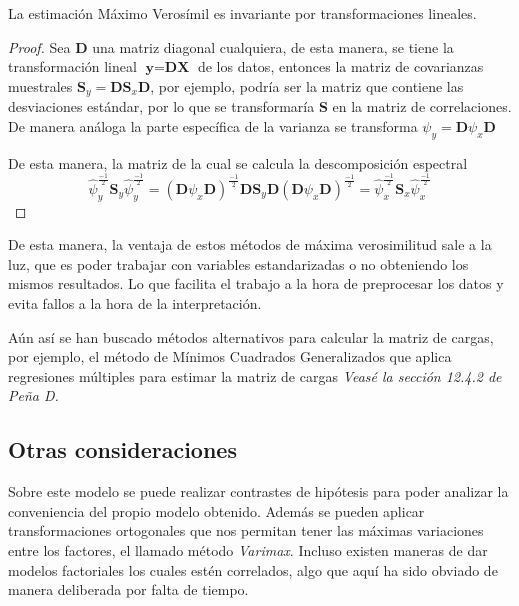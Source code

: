 \begin{propo}
La estimación Máximo Verosímil es invariante por transformaciones lineales. 
\begin{proof}
Sea $\textbf{D}$ una matriz diagonal cualquiera, de esta manera, se tiene la transformación lineal $\textbf{y}=\textbf{D}\textbf{X}$ de los datos, entonces la matriz de covarianzas muestrales $\textbf{S}_y=\textbf{D}\textbf{S}_x\textbf{D}$, por ejemplo, podría ser la matriz que contiene las desviaciones estándar, por lo que se transformaría $\textbf{S}$ en la matriz de correlaciones. De manera análoga la parte específica de la varianza se transforma $\psi_y=\textbf{D}\psi_x \textbf{D}$

\noindent De esta manera, la matriz de la cual se calcula la descomposición espectral
\begin{equation}
 \hat{\psi}_y^{\frac{-1}{2}}\textbf{S}_y\hat{\psi}_y^{\frac{-1}{2}}=(\textbf{D}\psi_x \textbf{D})^{\frac{-1}{2}}\textbf{D}\textbf{S}_y\textbf{D}(\textbf{D}\psi_x \textbf{D})^{\frac{-1}{2}}= \hat{\psi}_x^{\frac{-1}{2}}\textbf{S}_x\hat{\psi}_x^{\frac{-1}{2}}
\end{equation}\qedhere
\end{proof}
\end{propo}
\noindent De esta manera, la ventaja de estos métodos de máxima verosimilitud sale a la luz, que es poder trabajar con variables estandarizadas o no obteniendo los mismos resultados. Lo que facilita el trabajo a la hora de preprocesar los datos y evita fallos a la hora de la interpretación. 

\noindent Aún así se han buscado métodos alternativos para calcular la matriz de cargas, por ejemplo, el método de Mínimos Cuadrados Generalizados que aplica regresiones múltiples para estimar la matriz de cargas   \emph{Veasé la sección 12.4.2 de Peña D.}\cite{Peña 2002}

\subsection*{Otras consideraciones}
\noindent Sobre este modelo se puede realizar contrastes de hipótesis para poder analizar la conveniencia del propio modelo obtenido. Además se pueden aplicar transformaciones ortogonales que nos permitan tener las máximas variaciones entre los factores, el llamado método \emph{Varimax}. Incluso existen maneras de dar modelos factoriales los cuales estén correlados, algo que aquí ha sido obviado de manera deliberada por falta de tiempo. 











